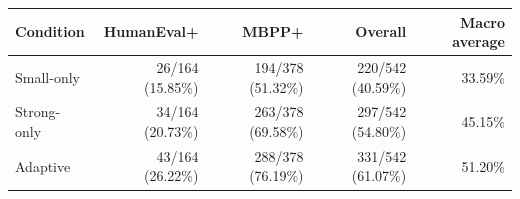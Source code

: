 \begin{tabular}{lrrrr}
\toprule
Condition & HumanEval+ & MBPP+ & Overall & Macro average \\
\midrule
Small-only & 26/164 (15.85\%) & 194/378 (51.32\%) & 220/542 (40.59\%) & 33.59\% \\
Strong-only & 34/164 (20.73\%) & 263/378 (69.58\%) & 297/542 (54.80\%) & 45.15\% \\
Adaptive & 43/164 (26.22\%) & 288/378 (76.19\%) & 331/542 (61.07\%) & 51.20\% \\
\bottomrule
\end{tabular}
